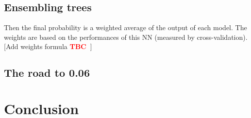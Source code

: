 \documentclass[a4paper,11pt,openany,extrafontsizes,oneside,article]{memoir}
\newcommand{\RP}{\textcolor{red}{\large{\textbf{TBC~}}}}
\begin{document}
\section{Ensembling trees}

Then the final probability is a weighted average of the output of each
model. The weights are based on the performances of this NN (measured
by cross-validation).  [Add weights formula \RP]

\section{The road to 0.06}
    
\chapter{Conclusion}




\backmatter%





% 
\end{document}
